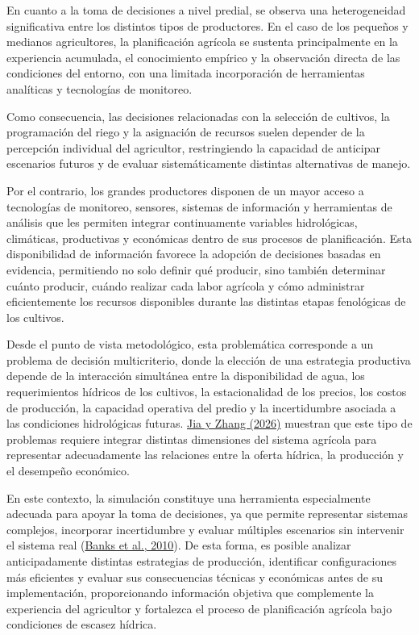 \documentclass[12pt]{report}
\newcommand{\citeref}[2]{\hyperlink{ref:#1}{#2}}
\begin{document}
En cuanto a la toma de decisiones a nivel predial, se observa una heterogeneidad significativa entre los distintos tipos de productores. En el caso de los pequeños y medianos agricultores, la planificación agrícola se sustenta principalmente en la experiencia acumulada, el conocimiento empírico y la observación directa de las condiciones del entorno, con una limitada incorporación de herramientas analíticas y tecnologías de monitoreo.

Como consecuencia, las decisiones relacionadas con la selección de cultivos, la programación del riego y la asignación de recursos suelen depender de la percepción individual del agricultor, restringiendo la capacidad de anticipar escenarios futuros y de evaluar sistemáticamente distintas alternativas de manejo.

Por el contrario, los grandes productores disponen de un mayor acceso a tecnologías de monitoreo, sensores, sistemas de información y herramientas de análisis que les permiten integrar continuamente variables hidrológicas, climáticas, productivas y económicas dentro de sus procesos de planificación. Esta disponibilidad de información favorece la adopción de decisiones basadas en evidencia, permitiendo no solo definir qué producir, sino también determinar cuánto producir, cuándo realizar cada labor agrícola y cómo administrar eficientemente los recursos disponibles durante las distintas etapas fenológicas de los cultivos.

Desde el punto de vista metodológico, esta problemática corresponde a un problema de decisión multicriterio, donde la elección de una estrategia productiva depende de la interacción simultánea entre la disponibilidad de agua, los requerimientos hídricos de los cultivos, la estacionalidad de los precios, los costos de producción, la capacidad operativa del predio y la incertidumbre asociada a las condiciones hidrológicas futuras. \citeref{jia2026}{Jia y Zhang (2026)} muestran que este tipo de problemas requiere integrar distintas dimensiones del sistema agrícola para representar adecuadamente las relaciones entre la oferta hídrica, la producción y el desempeño económico.

En este contexto, la simulación constituye una herramienta especialmente adecuada para apoyar la toma de decisiones, ya que permite representar sistemas complejos, incorporar incertidumbre y evaluar múltiples escenarios sin intervenir el sistema real (\citeref{banks2010}{Banks et al., 2010}). De esta forma, es posible analizar anticipadamente distintas estrategias de producción, identificar configuraciones más eficientes y evaluar sus consecuencias técnicas y económicas antes de su implementación, proporcionando información objetiva que complemente la experiencia del agricultor y fortalezca el proceso de planificación agrícola bajo condiciones de escasez hídrica.
\end{document}
